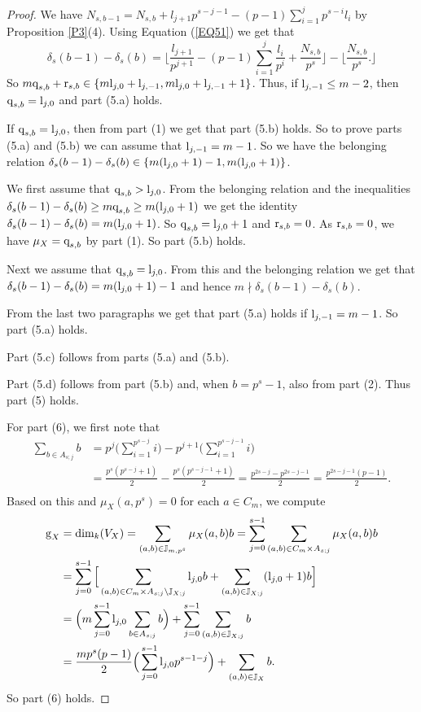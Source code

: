 \documentclass[11pt]{amsart}
\def\l{\textup{l}}
\def\r{\textup{r}}
\def\q{\textup{q}}
\begin{document}
\begin{proof}
We have $N_{s,b-1}=N_{s,b}+l_{j+1}p^{s-j-1}-(p-1)\sum_{i=1}^j p^{s-i}l_i$ by Proposition \ref{P3}(4). Using Equation (\ref{EQ51}) we get that
$$\delta_s(b-1)-\delta_s(b)=\Big\lfloor \frac{l_{j+1}}{p^{j+1}}-(p-1)\sum_{i=1}^j\frac{l_i}{p^i}+\frac{N_{s,b}}{p^s}\Big\rfloor-\Big\lfloor\frac{N_{s,b}}{p^s}.\Big\rfloor$$ 
So $m\q_{s,b}+\r_{s,b}\in\{m\l_{j,0}+\l_{j,-1},m\l_{j,0}+\l_{j,-1}+1\}$. Thus, if $\l_{j,-1}\le m-2$, then $\q_{s,b}=\l_{j,0}$ and part (5.a) holds. 

If $\q_{s,b}=\l_{j,0}$, then from part (1) we get that part (5.b) holds. So to prove parts (5.a) and (5.b) we can assume that $\l_{j,-1}=m-1$. So we have the belonging relation $\delta_s(b-1)-\delta_s(b)\in\{m(\l_{j,0}+1)-1,m(\l_{j,0}+1)\}$.

We first assume that $\q_{s,b}>\l_{j,0}$. From the belonging relation and the inequalities $\delta_s(b-1)-\delta_s(b)\ge m\q_{s,b}\ge m(\l_{j,0}+1)$ we get the identity $\delta_s(b-1)-\delta_s(b)=m(\l_{j,0}+1)$. So $\q_{s,b}=\l_{j,0}+1$ and $\r_{s,b}=0$. As $\r_{s,b}=0$, we have $\mu_X=\q_{s,b}$ by part (1). So part (5.b) holds. 

Next we assume that $\q_{s,b}=\l_{j,0}$. From this and the belonging relation we get that $\delta_s(b-1)-\delta_s(b)=m(\l_{j,0}+1)-1$ and hence $m\nmid \delta_s(b-1)-\delta_s(b)$. 

From the last two paragraphs we get that part (5.a) holds if $\l_{j,-1}=m-1$. So part (5.a) holds. 

Part (5.c) follows from parts (5.a) and (5.b). 

Part (5.d) follows from part (5.b) and, when $b=p^s-1$, also from part (2). Thus part (5) holds.

For part (6), we first note that 
\begin{equation*}
\begin{aligned}
\sum_{b\in A_{s;j}} b&=p^j\Big(\sum_{i=1}^{p^{s-j}} i\Big)-p^{j+1}\Big(\sum_{i=1}^{p^{s-j-1}} i\Big)\\
&=\frac{p^{s}(p^{s-j}+1)}{2}-\frac{p^{s}(p^{s-j-1}+1)}{2}=\frac{p^{2s-j}-p^{2s-j-1}}{2}=\frac{p^{2s-j-1}(p-1)}{2}.\\
\end{aligned}
\end{equation*}
Based on this and $\mu_X(a,p^s)=0$ for each $a\in C_m$, we compute
\begin{equation*}
\begin{aligned}
\textup{g}_X&=\dim_k(V_X)=\sum_{(a,b)\in\mathbb J_{m,p^s}}\mu_X(a,b)b=\sum_{j=0}^{s-1} \sum_{(a,b)\in C_m\times A_{s;j}}\mu_X(a,b)b\\
&=\sum_{j=0}^{s-1} \Big[\sum_{(a,b)\in C_m\times A_{s;j}\setminus\mathbb J_{X;j}} \l_{j,0}b+\sum_{(a,b)\in \mathbb J_{X;j}} (\l_{j,0}+1)b\Big]\\
&=\Big(m\sum_{j=0}^{s-1} \l_{j,0}\sum_{b\in A_{s;j}} b\Big)+\sum_{j=0}^{s-1}\sum_{(a,b)\in \mathbb J_{X;j}}b\\
&=\frac{mp^s(p-1)}{2}\Big(\sum_{j=0}^{s-1} \l_{j,0}p^{s-1-j}\Big)+\sum_{(a,b)\in\mathbb J_X} b.\\
\end{aligned}
\end{equation*}
So part (6) holds.\end{proof}
\end{document}
